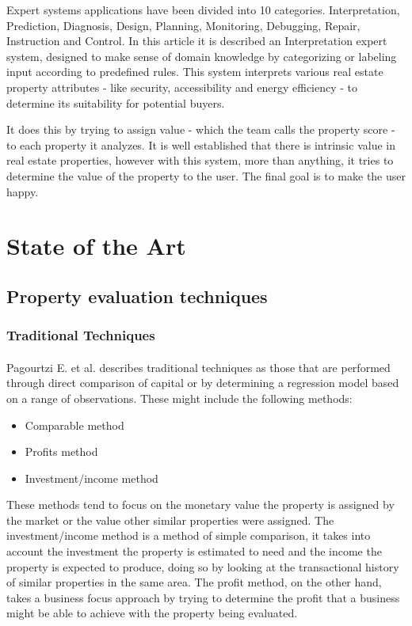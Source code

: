 \documentclass[runningheads]{llncs}
\begin{document}
Expert systems applications have been divided into 10 categories\cite{hayesroth}. Interpretation, Prediction, Diagnosis, Design, Planning, Monitoring, Debugging, Repair, Instruction and Control. In this article it is described an Interpretation expert system, designed to make sense of domain knowledge by categorizing or labeling input according to predefined rules. This system interprets various real estate property attributes - like security, accessibility and energy efficiency - to determine its suitability for potential buyers.

It does this by trying to assign value - which the team calls the property score - to each property it analyzes. It is well established that there is intrinsic value in real estate properties, however with this system, more than anything, it tries to determine the value of the property to the user. The final goal is to make the user happy.

\section{State of the Art}

\subsection{Property evaluation techniques}
\subsubsection{Traditional Techniques}
\paragraph{}
Pagourtzi E. et al.\cite{methods} describes traditional techniques as those that are performed through direct comparison of capital or by determining a regression model based on a range of observations. These might include the following methods:
\begin{itemize}
    \item Comparable method
    \item Profits method
    \item Investment/income method
\end{itemize}

These methods tend to focus on the monetary value the property is assigned by the market or the value other similar properties were assigned.
The investment/income method is a method of simple comparison, it takes into account the investment the property is estimated to need and the income the property is expected to produce, doing so by looking at the transactional history of similar properties in the same area. The profit method, on the other hand, takes a business focus approach by trying to determine the profit that a business might be able to achieve with the property being evaluated.
\end{document}
